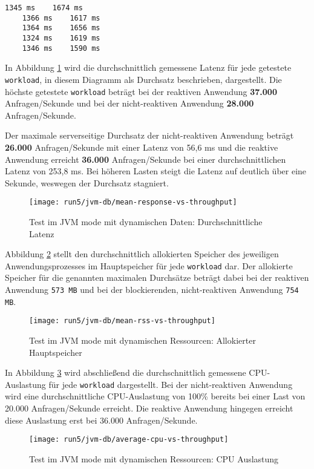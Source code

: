 \begin{lstlisting}[caption=Startzeiten im JVM mode mit dynamischen Ressourcen, captionpos=b, label=lst:starttimes_jvm_dynamic]
    1345 ms    1674 ms
    1366 ms    1617 ms
    1364 ms    1656 ms 
    1324 ms    1619 ms 
    1346 ms    1590 ms 
\end{lstlisting}

In Abbildung \ref{fig:jvm_dynamic_mean_response} wird die durchschnittlich gemessene Latenz für jede getestete \verb|workload|,
in diesem Diagramm als Durchsatz beschrieben, dargestellt.
Die höchste getestete \verb|workload| beträgt bei der reaktiven Anwendung \textbf{37.000} Anfragen/Sekunde und bei der
nicht-reaktiven Anwendung \textbf{28.000} Anfragen/Sekunde.

Der maximale serverseitige Durchsatz der nicht-reaktiven Anwendung beträgt \textbf{26.000} Anfragen/Sekunde mit einer
Latenz von 56,6 ms und
die reaktive Anwendung erreicht \textbf{36.000} Anfragen/Sekunde bei einer durchschnittlichen Latenz von 253,8 ms.
Bei höheren Lasten steigt die Latenz auf deutlich über eine Sekunde, weswegen der Durchsatz stagniert.
\newpage
\begin{figure}[ht!]
  \centering
  \texttt{[image: run5/jvm-db/mean-response-vs-throughput]}
  \caption{Test im JVM mode mit dynamischen Daten: Durchschnittliche Latenz}
  \label{fig:jvm_dynamic_mean_response}
\end{figure}
Abbildung \ref{fig:jvm_dynamic_mean_rss} stellt den durchschnittlich allokierten Speicher des jeweiligen Anwendungsprozesses
im Hauptspeicher für jede \verb|workload| dar. Der allokierte Speicher für die genannten maximalen Durchsätze beträgt dabei bei
der reaktiven Anwendung \verb|573 MB| und bei der blockierenden, nicht-reaktiven Anwendung \verb|754 MB|.
\newpage
\begin{figure}[ht!]
  \centering
  \texttt{[image: run5/jvm-db/mean-rss-vs-throughput]}
  \caption{Test im JVM mode mit dynamischen Ressourcen: Allokierter Hauptspeicher}
  \label{fig:jvm_dynamic_mean_rss}
\end{figure}

In Abbildung \ref{fig:jvm_dynamic_avg_cpu} wird abschließend die durchschnittlich gemessene CPU-Auslastung für jede \verb|workload|
dargestellt. Bei der nicht-reaktiven Anwendung wird eine durchschnittliche CPU-Auslastung von 100\% bereits bei einer Last von
20.000 Anfragen/Sekunde erreicht. Die reaktive Anwendung hingegen erreicht diese Auslastung erst bei 36.000 Anfragen/Sekunde.
\newpage
\begin{figure}[ht!]
  \centering
  \texttt{[image: run5/jvm-db/average-cpu-vs-throughput]}
  \caption{Test im JVM mode mit dynamischen Ressourcen: CPU Auslastung}
  \label{fig:jvm_dynamic_avg_cpu}
\end{figure}

